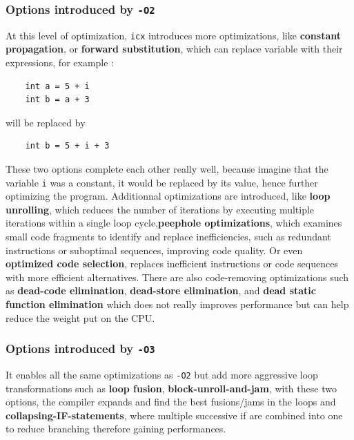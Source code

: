 \documentclass{rapport}
\newcommand{\icx}{\texttt{icx} }
\newcommand{\optitwo}{\texttt{-O2} }
\newcommand{\optithree}{\texttt{-O3} }
\begin{document}
\subsubsection{Options introduced by \optitwo}
At this level of optimization, \icx introduces more optimizations, like \textbf{constant propagation}, or \textbf{forward substitution}, which can replace variable with their expressions, for example : 
\begin{verbatim}
    int a = 5 + i
    int b = a + 3
\end{verbatim}
will be replaced by
\begin{verbatim}
    int b = 5 + i + 3
\end{verbatim}
These two options complete each other really well, because imagine that the variable \texttt{i} was a constant, it would be replaced by its value, hence further optimizing the program.\newline\newline
Additionnal optimizations are introduced, like \textbf{loop unrolling}, which reduces the number of iterations by executing multiple iterations within a single loop cycle,\textbf{peephole optimizations}, which examines small code fragments to identify and replace inefficiencies, such as redundant instructions or suboptimal sequences, improving code quality. Or even \textbf{optimized code selection}, replaces inefficient instructions or code sequences with more efficient alternatives.
\newline\newline
There are also code-removing optimizations such as \textbf{dead-code elimination}, \textbf{dead-store elimination}, and \textbf{dead static function elimination} which does not really improves performance but can help reduce the weight put on the CPU.

\subsubsection{Options introduced by \optithree}
It enables all the same optimizations as \optitwo but add more aggressive loop transformations such as \textbf{loop fusion}, \textbf{block-unroll-and-jam}, with these two options, the compiler expands and find the best fusions/jams in the loops and \textbf{collapsing-IF-statements}, where multiple successive if are combined into one to reduce branching therefore gaining performances.
\end{document}
